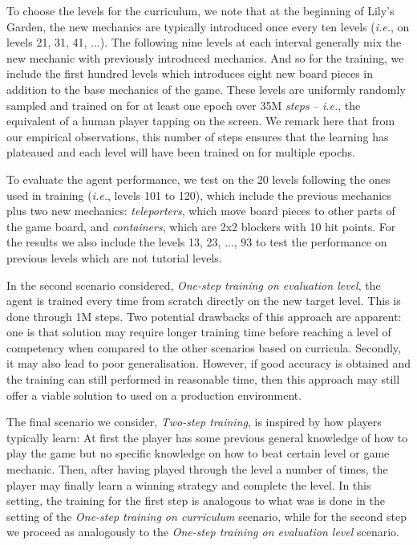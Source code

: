 \documentclass[conference]{IEEEtran}
\begin{document}
To choose the levels for the curriculum, we note that at the beginning of Lily's Garden, the new mechanics are typically introduced once every ten levels (\emph{i.e.}, on levels 21, 31, 41, ...). The following nine levels at each interval generally mix the new mechanic with previously introduced mechanics. And so for the training, we include the first hundred levels which introduces eight new board pieces in addition to the base mechanics of the game. These levels are uniformly randomly sampled and trained on for at least one epoch over 35M \emph{steps} -- \emph{i.e.}, the equivalent of a human player tapping on the screen. We remark here that from our empirical observations, this number of steps ensures that the learning has plateaued and each level will have been trained on for multiple epochs.

To evaluate the agent performance, we test on the 20 levels following the ones used in training (\emph{i.e.}, levels 101 to 120), which include the previous mechanics plus two new mechanics: \emph{teleporters}, which move board pieces to other parts of the game board, and \emph{containers}, which are 2x2 blockers with 10 hit points.
For the results we also include the levels 13, 23, ..., 93 to test the performance on previous levels which are not tutorial levels.

In the second scenario considered, \emph{One-step training on evaluation level}, the agent is trained every time from scratch directly on the new target level. This is done through 1M steps. 
Two potential drawbacks of this approach are apparent: 
one is that solution may require longer training time before reaching a level of competency when compared to the other scenarios based on curricula. 
Secondly, it may also lead to poor generalisation. 
However, if good accuracy is obtained and the training can still performed in reasonable time, then this approach may still offer a viable solution to used on a production environment.

The final scenario we consider, \emph{Two-step training}, is inspired by how players typically learn: At first the player has some previous general knowledge of how to play the game but no specific knowledge on how to beat certain level or game mechanic. Then, after having played through the level a number of times, the player may finally learn a winning strategy and complete the level. In this setting, the training for the first step is analogous to what was is done in the setting of the \emph{One-step training on curriculum} scenario, while for the second step we proceed as analogously to the \emph{One-step training on evaluation level} scenario. 
\end{document}

